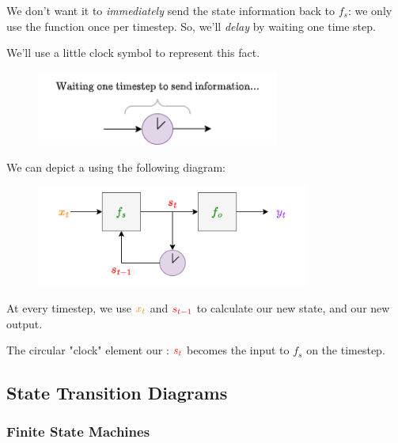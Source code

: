             We don't want it to \textit{immediately} send the state information back to $f_s$: we only use the function once per timestep. So, we'll \textit{delay} by waiting one time step.
            
            We'll use a little clock symbol to represent this fact.
            
            \begin{figure}[H]
                \centering
                \includegraphics[width=80mm,scale=0.4]{images/rnn_images/clock.png}
            \end{figure}
            
            \begin{notation}
                We can depict a  using the following diagram:
                
                \begin{figure}[H]
                    \centering
                    \includegraphics[width=90mm,scale=0.4]{images/rnn_images/state_machine_diagram.png}
                \end{figure}
                
                At every timestep, we use $\textcolor{orange}{x_t}$ and $\textcolor{red}{s_{t-1}}$ to calculate our new state, and our new output.
                
                The circular "clock" element our : $\textcolor{red}{s_t}$ becomes the input to $f_s$ on the  timestep.
            \end{notation}
    
    \secdiv
    
    \subsection{State Transition Diagrams}
    
        \subsubsection{Finite State Machines}
    
